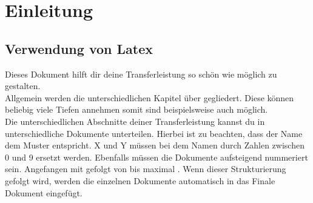 \section{Einleitung}

\subsection{Verwendung von Latex}
Dieses Dokument hilft dir deine Transferleistung so schön wie möglich zu gestalten.\\
Allgemein werden die unterschiedlichen Kapitel über  gegliedert. Diese können beliebig viele Tiefen annehmen somit sind beispielsweise auch  möglich. \\
Die unterschiedlichen Abschnitte deiner Transferleistung kannst du in unterschiedliche Dokumente unterteilen. Hierbei ist zu beachten, dass der Name dem Muster  entspricht. X und Y müssen bei dem Namen durch Zahlen zwischen 0 und 9 ersetzt werden. Ebenfalls müssen die Dokumente aufsteigend nummeriert sein. Angefangen mit  gefolgt von  bis maximal . Wenn dieser Strukturierung gefolgt wird, werden die einzelnen Dokumente automatisch in das Finale Dokument eingefügt.
